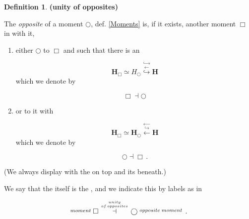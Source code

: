 \documentclass[12pt,titlepage]{article}
\theoremstyle{plain}
\theoremstyle{definition}
\newtheorem{defn}{Definition}
\theoremstyle{remark}
\begin{document}
\begin{defn}
\label{UnityOfOpposites}\hypertarget{UnityOfOpposites}{}
\textbf{(unity of opposites)}

The \emph{opposite} of a moment $\bigcirc$, def. \ref{Moments} is, if it exists, another moment $\Box$ in  with it,

\begin{enumerate}%
\item either $\bigcirc$  to $\Box$ and such that there is an 

\begin{displaymath}
\mathbf{H}_{\Box}\simeq H_{\bigcirc}
  \stackrel{\hookrightarrow}{\stackrel{\longleftarrow}{\hookrightarrow}}
  \mathbf{H}
\end{displaymath}
which we denote by

\begin{displaymath}
\Box \dashv \bigcirc
\end{displaymath}

\item or  to it with

\begin{displaymath}
\mathbf{H}_{\Box}\simeq \mathbf{H}_{\bigcirc}
  \stackrel{\longleftarrow}{\stackrel{\hookrightarrow}{\longleftarrow}}
  \mathbf{H}
\end{displaymath}
which we denote by

\begin{displaymath}
\bigcirc \dashv \Box
  \,.
\end{displaymath}


\end{enumerate}
(We always display  with the  on top and its  beneath.)

We say that the  itself is the \emph{}, and we indicate this by labels as in

\begin{displaymath}
\stackrel{moment}{} \Box \stackrel{unity \atop {of\,opposites}}{\dashv} \bigcirc \stackrel{opposite\;moment}{}
  \,.
\end{displaymath}
\end{defn}
\end{document}
